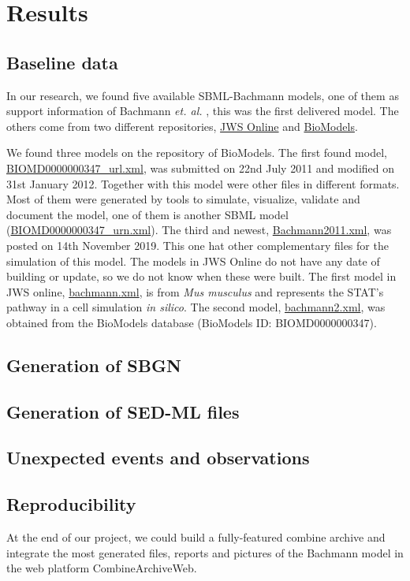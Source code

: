 \section*{Results} \label{sec:resuslt}
\subsection*{Baseline data}
In our research, we found five available SBML-Bachmann models, one of them as support information of Bachmann \textit{et. al.} \cite{bachmannmodel}, this was the first delivered model. The others come from two different repositories, \hyperlink{https://www.systemsmedicine.net/posts/jws-online-biological-systems-modelling}{JWS Online} and \hyperlink{https://www.ebi.ac.uk/biomodels/}{BioModels}.

We found three models on the repository of BioModels. The first found model, \hyperlink{https://www.ebi.ac.uk/biomodels/model/download/BIOMD0000000347.2?filename=BIOMD0000000347_url.xml}{\textsf{BIOMD0000000347\_url.xml}}, was submitted on 22nd July 2011 and modified on 31st January 2012. Together with this model were other files in different formats. Most of them were generated by tools to simulate, visualize, validate and document the model, one of them is another SBML model (\hyperlink{https://www.ebi.ac.uk/biomodels/model/download/BIOMD0000000347.2?filename=BIOMD0000000347_url.xml}{\textsf{BIOMD0000000347\_urn.xml}}). The third and newest, \hyperlink{https://www.ebi.ac.uk/biomodels/model/download/BIOMD0000000861.2?filename=Bachmann2011.xml}{\textsf{Bachmann2011.xml}}, was posted on 14th November 2019. This one hat other complementary files for the simulation of this model. The models in JWS Online do not have any date of building or update, so we do not know when these were built. The first model in JWS online, \hyperlink{https://jjj.bio.vu.nl/models/bachmann/sbml/?download=1}{\textsf{bachmann.xml}}, is from \textit{Mus musculus} and represents the STAT's pathway in a cell simulation \textit{in silico}. The second model, \hyperlink{https://jjj.bio.vu.nl/models/bachmann2/sbml/?download=1}{\textsf{bachmann2.xml}}, was obtained from the BioModels database (BioModels ID: BIOMD0000000347).

\subsection*{Generation of SBGN}

\subsection*{Generation of SED-ML files}

\subsection*{Unexpected events and observations}

\subsection*{Reproducibility}
At the end of our project, we could build a fully-featured \ac{combine} archive and integrate the most generated files, reports and pictures of the Bachmann model in the web platform CombineArchiveWeb.